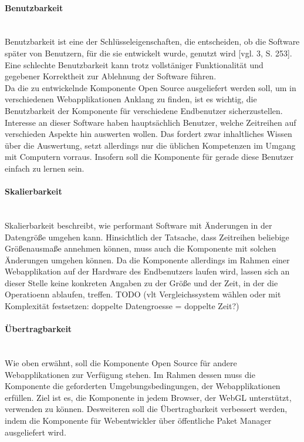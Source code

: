 \documentclass[12pt]{article}
\begin{document}
			\paragraph{Benutzbarkeit} $\;$ \\[0.3cm]
			Benutzbarkeit ist eine der Schlüsseleigenschaften, die entscheiden, ob die
			Software später von Benutzern, für die sie entwickelt wurde, genutzt wird
			[vgl.
			3, S. 253]. Eine schlechte Benutzbarkeit kann trotz vollstäniger
			Funktionalität und gegebener Korrektheit zur Ablehnung der Software
			führen.\\[0.2cm]
			Da die zu entwickelnde Komponente Open Source ausgeliefert werden soll,
			um in verschiedenen Webapplikationen Anklang zu finden, ist es wichtig, die
			Benutzbarkeit der Komponente für verschiedene Endbenutzer sicherzustellen. 
			Interesse an dieser Software haben hauptsächlich Benutzer, welche Zeitreihen
			auf verschieden Aspekte hin auswerten wollen. Das fordert zwar inhaltliches 
			Wissen über die Auswertung, setzt allerdings nur die üblichen Kompetenzen im 
			Umgang mit Computern vorraus. Insofern soll die Komponente für gerade diese 
			Benutzer einfach zu lernen sein.
			
			\paragraph{Skalierbarkeit} $\;$ \\[0.3cm]
			Skalierbarkeit beschreibt, wie performant Software mit Änderungen in der
			Datengröße umgehen kann. Hinsichtlich der Tatsache, dass Zeitreihen
			beliebige Größenausmaße annehmen können, muss auch die Komponente mit solchen
			Änderungen umgehen können. Da die Komponente allerdings im
			Rahmen einer Webapplikation auf der Hardware des Endbenutzers laufen wird,
			lassen sich an dieser Stelle keine konkreten Angaben zu der Größe und der
			Zeit, in der die Operatioenn ablaufen, treffen. TODO (vlt Vergleichssystem
			wählen oder mit Komplexität festsetzen: doppelte Datengroesse = doppelte
			Zeit?)
			
			\paragraph{Übertragbarkeit} $\;$ \\[0.3cm]
			Wie oben erwähnt, soll die Komponente Open Source für andere
			Webapplikationen zur Verfügung stehen. Im Rahmen dessen muss die Komponente
			die geforderten Umgebungsbedingungen, der Webapplikationen erfüllen. Ziel ist
			es, die Komponente in jedem Browser, der WebGL unterstützt, verwenden zu
			können. Desweiteren soll die Übertragbarkeit verbessert werden, indem die
			Komponente für Webentwickler über öffentliche Paket Manager ausgeliefert
			wird.
			
\end{document}
